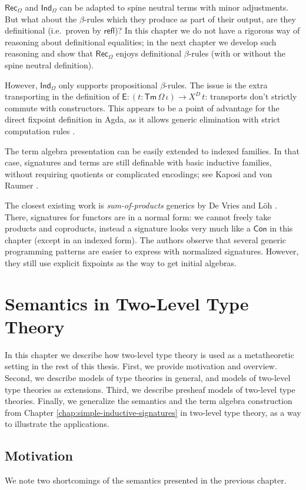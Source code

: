 \documentclass[12pt,a4paper,twoside,openany]{book}
\theoremstyle{remark}
\theoremstyle{definition}
\newcommand{\ms}[1]{\mathsf{#1}}
\newcommand{\refl}{\mathsf{refl}}
\newcommand{\Con}{\mathsf{Con}}
\newcommand{\Tm}{\mathsf{Tm}}
\newcommand{\Rec}{\ms{Rec}}
\newcommand{\Ind}{\ms{Ind}}
\begin{document}
$\Rec_\Omega$ and $\Ind_\Omega$ can be adapted to spine neutral terms with minor
adjustments. But what about the $\beta$-rules which they produce as part of
their output, are they definitional (i.e.\ proven by $\refl$)? In this chapter
we do not have a rigorous way of reasoning about definitional equalities; in the
next chapter we develop such reasoning and show that $\Rec_\Omega$ enjoys
definitional $\beta$-rules (with or without the spine neutral
definition).

However, $\Ind_\Omega$ only supports propositional $\beta$-rules. The issue is
the extra transporting in the definition of $\ms{E} : (t : \Tm\,\Omega\,\iota)
\to X^D\,t$: transports don't strictly commute with constructors. This appears
to be a point of advantage for the direct fixpoint definition in Agda, as it
allows generic elimination with strict computation rules \cite{TODO}.

The term algebra presentation can be easily extended to indexed families. In
that case, signatures and terms are still definable with basic inductive
families, without requiring quotients or complicated encodings; see Kaposi and
von Raumer \cite{mutualinductive}.

The closest existing work is \emph{sum-of-products} generics by De Vries and Löh
\cite{sop}. There, signatures for functors are in a normal form: we cannot
freely take products and coproducts, instead a signature looks very much like a
$\Con$ in this chapter (except in an indexed form). The authors observe that
several generic programming patterns are easier to express with normalized
signatures. However, they still use explicit fixpoints as the way to get initial
algebras.

\chapter{Semantics in Two-Level Type Theory}
\label{chap:2ltt}

In this chapter we describe how two-level type theory is used as a metatheoretic
setting in the rest of this thesis. First, we provide motivation and
overview. Second, we describe models of type theories in general, and models of
two-level type theories as extensions. Third, we describe presheaf models of
two-level type theories. Finally, we generalize the semantics and the term
algebra construction from Chapter \ref{chap:simple-inductive-signatures} in
two-level type theory, as a way to illustrate the applications.

\section{Motivation}
\label{sec:2ltt-motivation}
We note two shortcomings of the semantics presented in the
previous chapter.
\end{document}
